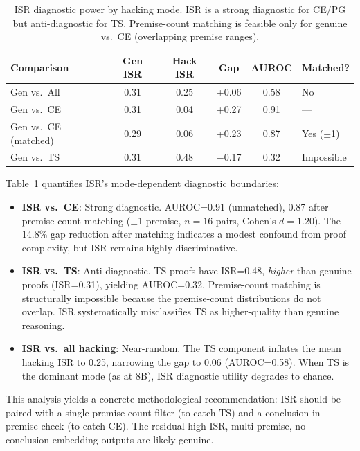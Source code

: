 \documentclass[11pt,a4paper]{article}
\begin{document}
\begin{table}[t]
\centering
\caption{ISR diagnostic power by hacking mode. ISR is a strong diagnostic for CE/PG but anti-diagnostic for TS. Premise-count matching is feasible only for genuine vs.\ CE (overlapping premise ranges).}
\label{tab:diagnostic-power}
\small
\begin{tabular}{lccccl}
\toprule
Comparison & Gen ISR & Hack ISR & Gap & AUROC & Matched? \\
\midrule
Gen vs.\ All & 0.31 & 0.25 & +0.06 & 0.58 & No \\
Gen vs.\ CE & 0.31 & 0.04 & +0.27 & 0.91 & --- \\
Gen vs.\ CE (matched) & 0.29 & 0.06 & +0.23 & 0.87 & Yes ($\pm$1) \\
Gen vs.\ TS & 0.31 & 0.48 & $-$0.17 & 0.32 & Impossible \\
\bottomrule
\end{tabular}
\end{table}

Table~\ref{tab:diagnostic-power} quantifies ISR's mode-dependent diagnostic boundaries:

\begin{itemize}
    \item \textbf{ISR vs.\ CE}: Strong diagnostic. AUROC=0.91 (unmatched), 0.87 after premise-count matching ($\pm$1 premise, $n=16$ pairs, Cohen's $d=1.20$). The 14.8\% gap reduction after matching indicates a modest confound from proof complexity, but ISR remains highly discriminative.

    \item \textbf{ISR vs.\ TS}: Anti-diagnostic. TS proofs have ISR=0.48, \emph{higher} than genuine proofs (ISR=0.31), yielding AUROC=0.32. Premise-count matching is structurally impossible because the premise-count distributions do not overlap. ISR systematically misclassifies TS as higher-quality than genuine reasoning.

    \item \textbf{ISR vs.\ all hacking}: Near-random. The TS component inflates the mean hacking ISR to 0.25, narrowing the gap to 0.06 (AUROC=0.58). When TS is the dominant mode (as at 8B), ISR diagnostic utility degrades to chance.
\end{itemize}

This analysis yields a concrete methodological recommendation: ISR should be paired with a single-premise-count filter (to catch TS) and a conclusion-in-premise check (to catch CE).
The residual high-ISR, multi-premise, no-conclusion-embedding outputs are likely genuine.
\end{document}
